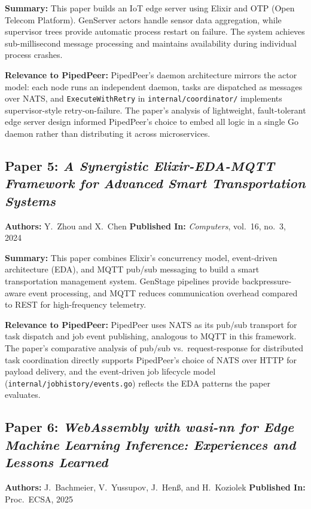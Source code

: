 \noindent\textbf{Summary:}
This paper builds an IoT edge server using Elixir and OTP (Open Telecom Platform).
GenServer actors handle sensor data aggregation, while supervisor trees provide
automatic process restart on failure. The system achieves sub-millisecond message
processing and maintains availability during individual process crashes.

\noindent\textbf{Relevance to PipedPeer:}
PipedPeer's daemon architecture mirrors the actor model: each node runs an
independent daemon, tasks are dispatched as messages over NATS, and
\texttt{ExecuteWithRetry} in \texttt{internal/coordinator/} implements supervisor-style
retry-on-failure. The paper's analysis of lightweight, fault-tolerant edge server
design informed PipedPeer's choice to embed all logic in a single Go daemon rather
than distributing it across microservices.

\subsection*{Paper 5: \textit{A Synergistic Elixir-EDA-MQTT Framework for Advanced
Smart Transportation Systems}}
\textbf{Authors:} Y.~Zhou and X.~Chen \quad
\textbf{Published In:} \textit{Computers}, vol.~16, no.~3, 2024~\cite{zhou2024}

\noindent\textbf{Summary:}
This paper combines Elixir's concurrency model, event-driven architecture (EDA), and
MQTT pub/sub messaging to build a smart transportation management system. GenStage
pipelines provide backpressure-aware event processing, and MQTT reduces communication
overhead compared to REST for high-frequency telemetry.

\noindent\textbf{Relevance to PipedPeer:}
PipedPeer uses NATS as its pub/sub transport for task dispatch and job event
publishing, analogous to MQTT in this framework. The paper's comparative analysis
of pub/sub vs.\ request-response for distributed task coordination directly supports
PipedPeer's choice of NATS over HTTP for payload delivery, and the event-driven job
lifecycle model (\texttt{internal/jobhistory/events.go}) reflects the EDA patterns
the paper evaluates.

\subsection*{Paper 6: \textit{WebAssembly with wasi-nn for Edge Machine Learning
Inference: Experiences and Lessons Learned}}
\textbf{Authors:} J.~Bachmeier, V.~Yussupov, J.~Henß, and H.~Koziolek \quad
\textbf{Published In:} Proc.\ ECSA, 2025~\cite{bachmeier2025}

